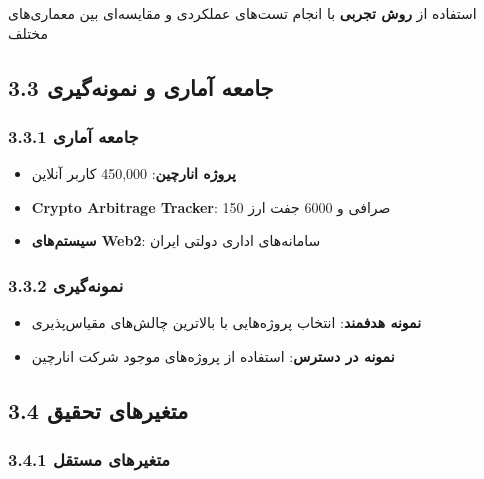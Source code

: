 \documentclass[
]{article}
\providecommand{\tightlist}{%
  \setlength{\itemsep}{0pt}\setlength{\parskip}{0pt}}
\begin{document}
استفاده از \textbf{روش تجربی} با انجام تست‌های عملکردی و مقایسه‌ای بین
معماری‌های مختلف

\subsection{3.3 جامعه آماری و
نمونه‌گیری}\label{ux62cux627ux645ux639ux647-ux622ux645ux627ux631ux6cc-ux648-ux646ux645ux648ux646ux647ux6afux6ccux631ux6cc}

\subsubsection{3.3.1 جامعه
آماری}\label{ux62cux627ux645ux639ux647-ux622ux645ux627ux631ux6cc}

\begin{itemize}
\tightlist
\item
  \textbf{پروژه انارچین}: 450,000 کاربر آنلاین
\item
  \textbf{Crypto Arbitrage Tracker}: 150 صرافی و 6000 جفت ارز
\item
  \textbf{سیستم‌های Web2}: سامانه‌های اداری دولتی ایران
\end{itemize}

\subsubsection{3.3.2
نمونه‌گیری}\label{ux646ux645ux648ux646ux647ux6afux6ccux631ux6cc}

\begin{itemize}
\tightlist
\item
  \textbf{نمونه هدفمند}: انتخاب پروژه‌هایی با بالاترین چالش‌های مقیاس‌پذیری
\item
  \textbf{نمونه در دسترس}: استفاده از پروژه‌های موجود شرکت انارچین
\end{itemize}

\subsection{3.4 متغیرهای
تحقیق}\label{ux645ux62aux63aux6ccux631ux647ux627ux6cc-ux62aux62dux642ux6ccux642}

\subsubsection{3.4.1 متغیرهای
مستقل}\label{ux645ux62aux63aux6ccux631ux647ux627ux6cc-ux645ux633ux62aux642ux644}
\end{document}
